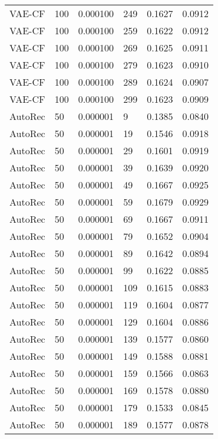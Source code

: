 \begin{tabular}{llrlrr}
  VAE-CF &  100 &  0.000100 &   249 &  0.1627 &       0.0912 \\
  VAE-CF &  100 &  0.000100 &   259 &  0.1622 &       0.0912 \\
  VAE-CF &  100 &  0.000100 &   269 &  0.1625 &       0.0911 \\
  VAE-CF &  100 &  0.000100 &   279 &  0.1623 &       0.0910 \\
  VAE-CF &  100 &  0.000100 &   289 &  0.1624 &       0.0907 \\
  VAE-CF &  100 &  0.000100 &   299 &  0.1623 &       0.0909 \\
 AutoRec &   50 &  0.000001 &     9 &  0.1385 &       0.0840 \\
 AutoRec &   50 &  0.000001 &    19 &  0.1546 &       0.0918 \\
 AutoRec &   50 &  0.000001 &    29 &  0.1601 &       0.0919 \\
 AutoRec &   50 &  0.000001 &    39 &  0.1639 &       0.0920 \\
 AutoRec &   50 &  0.000001 &    49 &  0.1667 &       0.0925 \\
 AutoRec &   50 &  0.000001 &    59 &  0.1679 &       0.0929 \\
 AutoRec &   50 &  0.000001 &    69 &  0.1667 &       0.0911 \\
 AutoRec &   50 &  0.000001 &    79 &  0.1652 &       0.0904 \\
 AutoRec &   50 &  0.000001 &    89 &  0.1642 &       0.0894 \\
 AutoRec &   50 &  0.000001 &    99 &  0.1622 &       0.0885 \\
 AutoRec &   50 &  0.000001 &   109 &  0.1615 &       0.0883 \\
 AutoRec &   50 &  0.000001 &   119 &  0.1604 &       0.0877 \\
 AutoRec &   50 &  0.000001 &   129 &  0.1604 &       0.0886 \\
 AutoRec &   50 &  0.000001 &   139 &  0.1577 &       0.0860 \\
 AutoRec &   50 &  0.000001 &   149 &  0.1588 &       0.0881 \\
 AutoRec &   50 &  0.000001 &   159 &  0.1566 &       0.0863 \\
 AutoRec &   50 &  0.000001 &   169 &  0.1578 &       0.0880 \\
 AutoRec &   50 &  0.000001 &   179 &  0.1533 &       0.0845 \\
 AutoRec &   50 &  0.000001 &   189 &  0.1577 &       0.0878 \\

\end{tabular}
